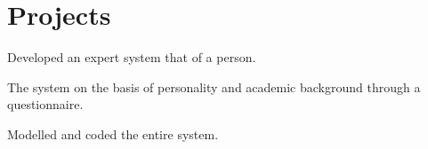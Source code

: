 \documentclass[]{deedy-resume-openfont}
\begin{document}
\begin{minipage}[t]{0.66\textwidth}


\section{Projects}



{}
\begin{tightemize}
\item Developed an expert system that  of a person. 
\item The system  on the basis of personality and academic background through a questionnaire.
\item Modelled and coded the entire system. \custombold{}
\end{tightemize}
\sectionsep


\end{minipage}
\end{document}
